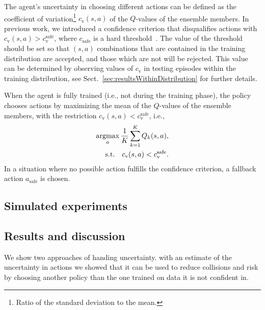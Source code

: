 
The agent's uncertainty in choosing different actions can be defined as the coefficient of variation\footnote{Ratio of the standard deviation to the mean.} $c_\mathrm{v}(s,a)$ of the $Q$-values of the ensemble members.  
In previous work, we introduced a confidence criterion that disqualifies actions with $c_\mathrm{v}(s,a) > c_\mathrm{v}^\mathrm{safe}$, where $c_\mathrm{safe}$ is a hard threshold~\cite{Hoel2020}. 
The value of the threshold should be set so that $(s,a)$ combinations that are contained in the training distribution are accepted, and those which are not will be rejected. This value can be determined by observing values of $c_\mathrm{v}$ in testing episodes within the training distribution, see Sect.~\ref{sec:resultsWithinDistribution} for further details. 



When the agent is fully trained (i.e., not during the training phase), the policy chooses actions by maximizing the mean of the $Q$-values of the ensemble members, with the restriction $c_\mathrm{v}(s,a) < c_\mathrm{v}^\mathrm{safe}$, i.e.,
%
\begin{equation}
	\begin{aligned}
		\operatorname*{argmax}_{a} \frac{1}{K} \sum_{k=1}^K Q_k(s,a),\\
		\textrm{s.t.} \quad c_\mathrm{v}(s,a) < c_\mathrm{v}^\mathrm{safe}.
	\end{aligned}
\end{equation}
%
In a situation where no possible action fulfills the confidence criterion, a fallback action $a_\mathrm{safe}$ is chosen.



\subsection{Simulated experiments}

\subsection{Results and discussion}
We show two approaches of handing uncertainty. with an estimate of the uncertainty in actions we showed that it can be used to reduce collisions and risk by choosing another policy than the one trained on data it is not confident in. 


